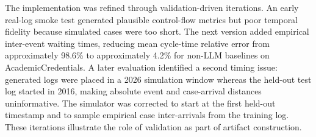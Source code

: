 The implementation was refined through validation-driven iterations. An
early real-log smoke test generated plausible control-flow metrics but
poor temporal fidelity because simulated cases were too short. The next
version added empirical inter-event waiting times, reducing mean
cycle-time relative error from approximately 98.6\% to approximately
4.2\% for non-LLM baselines on AcademicCredentials. A later evaluation
identified a second timing issue: generated logs were placed in a 2026
simulation window whereas the held-out test log started in 2016, making
absolute event and case-arrival distances uninformative. The simulator
was corrected to start at the first held-out timestamp and to sample
empirical case inter-arrivals from the training log. These iterations
illustrate the role of validation as part of artifact construction.

